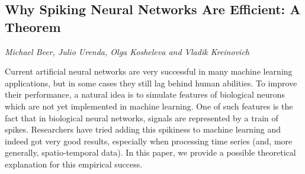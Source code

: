\documentclass[../booklet.tex]{subfiles}
\begin{document}
\subsection[Why Spiking Neural Networks Are Efficient: A Theorem. {\it Michael Beer, Julio Urenda, Olga Kosheleva and Vladik Kreinovich}]{Why Spiking Neural Networks Are Efficient: A Theorem}
   

\begin{center}
  {\it Michael Beer, Julio Urenda, Olga Kosheleva and Vladik Kreinovich}
\end{center}

\vskip 0.8cm


Current artificial neural networks are very successful in many
machine learning applications, but in some cases they still lag
behind human abilities. To improve their performance, a natural
idea is to simulate features of biological neurons which are not
yet implemented in machine learning. One of such features is the
fact that in biological neural networks, signals are represented by
a train of spikes. Researchers have tried adding this spikiness to
machine learning and indeed got very good results, especially when
processing time series (and, more generally, spatio-temporal data).
In this paper, we provide a possible theoretical explanation for this
empirical success.

\end{document}
